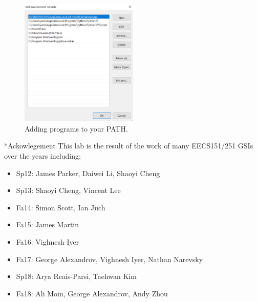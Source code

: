 \documentclass[11pt]{article}
\makeatletter
\renewcommand{\section}
{\@startsection {section}{1}{0pt}
 {-2ex}
 {1ex}
 {\bfseries\Large}}
\makeatother
\begin{document}
\begin{figure}[ht]
  \centering
  \includegraphics[width=0.5\textwidth]{figs/environment_variables_3.png}
  \caption{Adding programs to your PATH.}
  \label{fig:envVars3}
\end{figure}
\newpage
\section*{Ackowlegement}
This lab is the result of the work of many EECS151/251 GSIs over the years including:
\begin{itemize}
\item Sp12: James Parker, Daiwei Li, Shaoyi Cheng
\item Sp13: Shaoyi Cheng, Vincent Lee
\item Fa14: Simon Scott, Ian Juch
\item Fa15: James Martin
\item Fa16: Vighnesh Iyer
\item Fa17: George Alexandrov, Vighnesh Iyer, Nathan Narevsky
\item Sp18: Arya Reais-Parsi, Taehwan Kim
\item Fa18: Ali Moin, George Alexandrov, Andy Zhou
\end{itemize}
\end{document}
